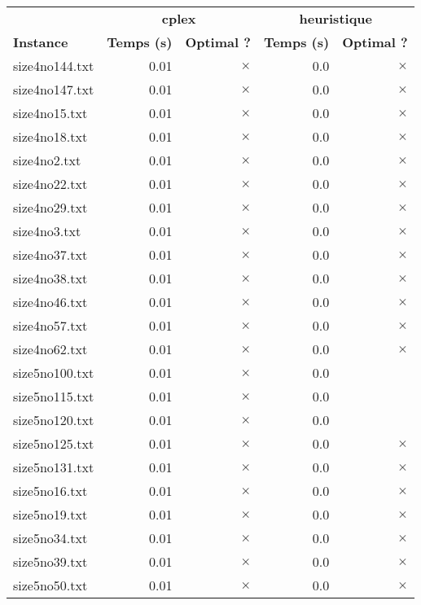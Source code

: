 \documentclass{article}
\begin{document}
\newpage
\begin{center}
\renewcommand{\arraystretch}{1.4} 
 \begin{tabular}{lrrrr}
	\hline
 & \multicolumn{2}{c}{\textbf{cplex}} & \multicolumn{2}{c}{\textbf{heuristique}}\\
\textbf{Instance}  & \textbf{Temps (s)} & \textbf{Optimal ?}  & \textbf{Temps (s)} & \textbf{Optimal ?} \\\hline

size4no144.txt & 0.01 & 
$\times$
 & 0.0 & 
$\times$
\\
size4no147.txt & 0.01 & 
$\times$
 & 0.0 & 
$\times$
\\
size4no15.txt & 0.01 & 
$\times$
 & 0.0 & 
$\times$
\\
size4no18.txt & 0.01 & 
$\times$
 & 0.0 & 
$\times$
\\
size4no2.txt & 0.01 & 
$\times$
 & 0.0 & 
$\times$
\\
size4no22.txt & 0.01 & 
$\times$
 & 0.0 & 
$\times$
\\
size4no29.txt & 0.01 & 
$\times$
 & 0.0 & 
$\times$
\\
size4no3.txt & 0.01 & 
$\times$
 & 0.0 & 
$\times$
\\
size4no37.txt & 0.01 & 
$\times$
 & 0.0 & 
$\times$
\\
size4no38.txt & 0.01 & 
$\times$
 & 0.0 & 
$\times$
\\
size4no46.txt & 0.01 & 
$\times$
 & 0.0 & 
$\times$
\\
size4no57.txt & 0.01 & 
$\times$
 & 0.0 & 
$\times$
\\
size4no62.txt & 0.01 & 
$\times$
 & 0.0 & 
$\times$
\\
size5no100.txt & 0.01 & 
$\times$
 & 0.0 & 
\\
size5no115.txt & 0.01 & 
$\times$
 & 0.0 & 
\\
size5no120.txt & 0.01 & 
$\times$
 & 0.0 & 
\\
size5no125.txt & 0.01 & 
$\times$
 & 0.0 & 
$\times$
\\
size5no131.txt & 0.01 & 
$\times$
 & 0.0 & 
$\times$
\\
size5no16.txt & 0.01 & 
$\times$
 & 0.0 & 
$\times$
\\
size5no19.txt & 0.01 & 
$\times$
 & 0.0 & 
$\times$
\\
size5no34.txt & 0.01 & 
$\times$
 & 0.0 & 
$\times$
\\
size5no39.txt & 0.01 & 
$\times$
 & 0.0 & 
$\times$
\\
size5no50.txt & 0.01 & 
$\times$
 & 0.0 & 
$\times$

\end{tabular}
\end{center}
\end{document}
